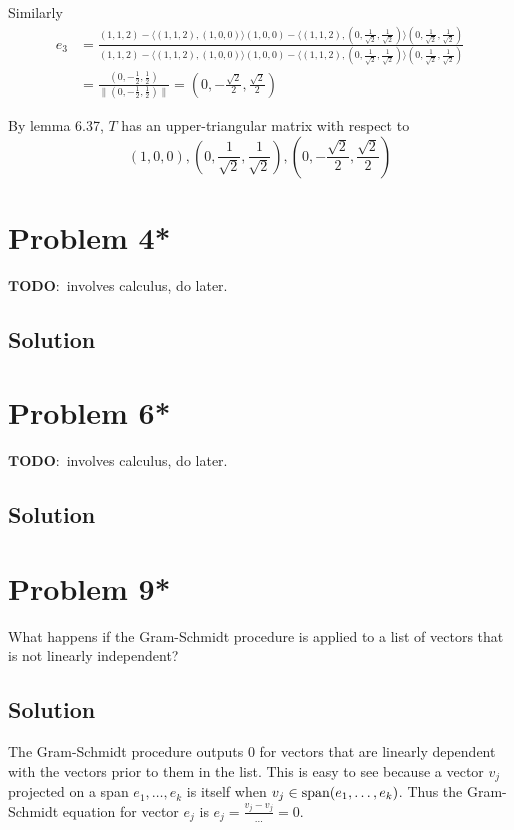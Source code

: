 \documentclass{article}
\begin{document}
Similarly
\begin{align*}
    e_3&=\frac{(1,1,2)-\langle(1,1,2),(1,0,0)\rangle(1,0,0)-\langle(1,1,2),(0,\frac{1}{\sqrt{2}}, \frac{1}{\sqrt{2}})\rangle(0,\frac{1}{\sqrt{2}}, \frac{1}{\sqrt{2}})}{(1,1,2)-\langle(1,1,2),(1,0,0)\rangle(1,0,0)-\langle(1,1,2),(0,\frac{1}{\sqrt{2}}, \frac{1}{\sqrt{2}})\rangle(0,\frac{1}{\sqrt{2}}, \frac{1}{\sqrt{2}})}\\
    &=\frac{(0,-\frac{1}{2},\frac{1}{2})}{\|(0,-\frac{1}{2},\frac{1}{2})\|}=(0,-\frac{\sqrt{2}}{2}, \frac{\sqrt{2}}{2})
\end{align*}

\vs

By lemma 6.37, $T$ has an upper-triangular matrix with respect to
\[(1,0,0), (0,\frac{1}{\sqrt{2}}, \frac{1}{\sqrt{2}}), (0,-\frac{\sqrt{2}}{2}, \frac{\sqrt{2}}{2})\]

\section*{Problem 4*}
$\mathbf{TODO:}$ involves calculus, do later.

\subsection*{Solution}

\section*{Problem 6*}
$\mathbf{TODO:}$ involves calculus, do later.

\subsection*{Solution}

\section*{Problem 9*}
What happens if the Gram-Schmidt procedure is applied to a list of vectors that is not linearly independent?

\subsection*{Solution}
The Gram-Schmidt procedure outputs $0$ for vectors that are linearly dependent with the vectors prior to them in the list. This is easy to see because a vector $v_j$ projected on a span $e_1,\ldots,e_k$ is itself when $v_j\in\text{span}(e_1,\ldots,e_k)$. Thus the Gram-Schmidt equation for vector $e_j$ is $e_j=\frac{v_j-v_j}{\ldots}=0$.
\end{document}
